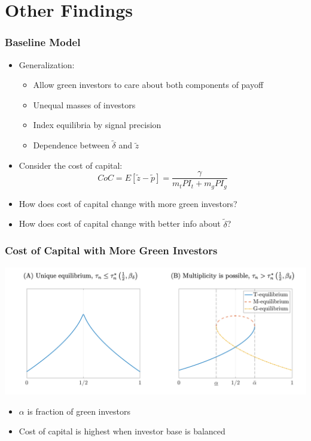 \documentclass{beamer}
\begin{document}
\section{Other Findings}

\begin{frame}
\frametitle{Baseline Model}
\begin{itemize}[<+->]
\item Generalization:
\begin{itemize}[<+->]
\item Allow green investors to care about both components of payoff
\item Unequal masses of investors
\item Index equilibria by signal precision
\item Dependence between $\tilde\delta$ and $\tilde z$
\end{itemize}
\bigskip
\item Consider the cost of capital:
$$
CoC = E[\tilde z - \tilde p] = \frac{\gamma}{m_t PI_t + m_g PI_g}
$$
\item How does cost of capital change with more green investors?
\bigskip
\item How does cost of capital change with better info about $\tilde\delta$?
\end{itemize}
\end{frame}


\begin{frame}
\frametitle{Cost of Capital with More Green Investors}
\begin{center}
\includegraphics[scale=0.5]{investor_share}
\end{center}
\begin{itemize}[<+->]
\item $\alpha$ is fraction of green investors
\item Cost of capital is highest when investor base is balanced
\end{itemize}
\end{frame}
\end{document}
